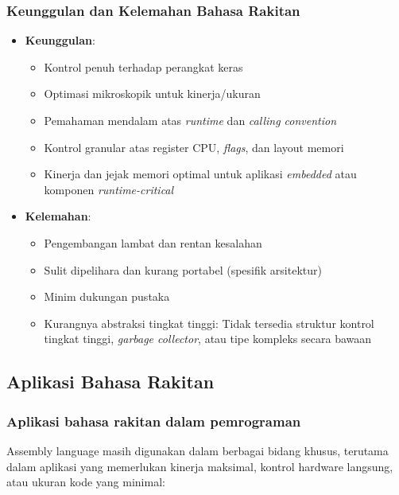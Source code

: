 \documentclass[../main.tex]{subfiles}
\begin{document}
\subsubsection{Keunggulan dan Kelemahan Bahasa Rakitan}
\begin{itemize}
    \item \textbf{Keunggulan}:
    \begin{itemize}
        \item Kontrol penuh terhadap perangkat keras
        \item Optimasi mikroskopik untuk kinerja/ukuran
        \item Pemahaman mendalam atas \textit{runtime} dan \textit{calling convention}
        \item Kontrol granular atas register CPU, \textit{flags}, dan layout memori
        \item Kinerja dan jejak memori optimal untuk aplikasi \textit{embedded} atau komponen \textit{runtime-critical}
    \end{itemize}
    \item \textbf{Kelemahan}:
    \begin{itemize}
        \item Pengembangan lambat dan rentan kesalahan
        \item Sulit dipelihara dan kurang portabel (spesifik arsitektur)
        \item Minim dukungan pustaka
        \item Kurangnya abstraksi tingkat tinggi: Tidak tersedia struktur kontrol tingkat tinggi, \textit{garbage collector}, atau tipe kompleks secara bawaan
    \end{itemize}
\end{itemize}

\subsection{Aplikasi Bahasa Rakitan}\label{subsec:pengenalan-aplikasi}

\subsubsection{Aplikasi bahasa rakitan dalam pemrograman}
Assembly language masih digunakan dalam berbagai bidang khusus, terutama dalam aplikasi yang memerlukan kinerja maksimal, kontrol hardware langsung, atau ukuran kode yang minimal:
\end{document}

